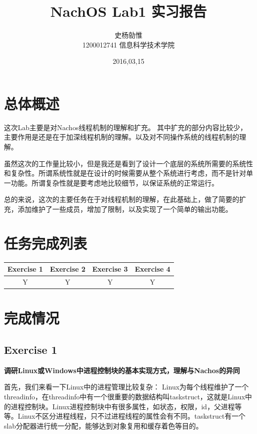 \documentclass{ctexart}
\begin{document}
\title{%
\vspace{-30mm}\heiti\Huge NachOS Lab1 实习报告 \vspace{10mm}}
\author{%
\Large 史杨勍惟 
\\[10mm] 1200012741 信息科学技术学院}
\date{2016,03,15}

\maketitle

\newpage
\tableofcontents
\newpage

\section{总体概述}
这次Lab主要是对Nachos线程机制的理解和扩充。
其中扩充的部分内容比较少，主要作用是还是在于加深线程机制的理解。以及对不同操作系统的线程机制的理解。

虽然这次的工作量比较小，但是我还是看到了设计一个底层的系统所需要的系统性和复杂性。所谓系统性就是在设计的时候需要从整个系统进行考虑，而不是针对单一功能。所谓复杂性就是要考虑地比较细节，以保证系统的正常运行。

总的来说，这次的主要任务在于对线程机制的理解，在此基础上，做了简要的扩充，添加维护了一些成员，增加了限制，以及实现了一个简单的输出功能。

\section{任务完成列表}
\begin{table}[h]
\centering
\footnotesize
\begin{tabular}{|c|c|c|c|}\hline
\textbf{Exercise 1} & \textbf{Exercise 2} & \textbf{Exercise 3} & \textbf{Exercise 4} \\\hline
Y & Y & Y & Y \\\hline

\end{tabular}

\end{table}
\section{完成情况}
\subsection*{Exercise 1}
\textbf{调研Linux或Windows中进程控制块的基本实现方式，理解与Nachos的异同}

首先，我们来看一下Linux中的进程管理比较复杂：
Linux为每个线程维护了一个threadinfo，在threadinfo中有一个很重要的数据结构叫taskstruct，这就是Linux中的进程控制块。Linux进程控制块中有很多属性，如状态，权限，id，父进程等等。Linux不区分进程线程，只不过进程线程的属性会有不同。taskstruct有一个slab分配器进行统一分配，能够达到对象复用和缓存着色等目的。
\end{document}
